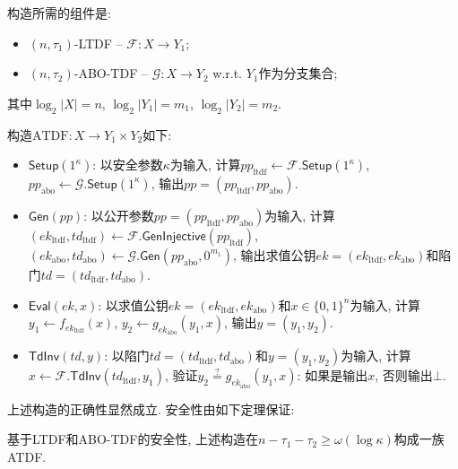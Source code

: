 \begin{construction}
\begin{trivlist}
\item 构造所需的组件是:
\begin{itemize}
    \item $(n, \tau_1)$-LTDF -- $\mathcal{F}: X \rightarrow Y_1$; 
    \item $(n, \tau_2)$-ABO-TDF -- $\mathcal{G}: X \rightarrow Y_2$ w.r.t. $Y_1$作为分支集合; 
\end{itemize}
其中$\log_2 |X| = n$, $\log_2 |Y_1| = m_1$, $\log_2 |Y_2| = m_2$. 

\item 构造$\text{ATDF}: X \rightarrow Y_1 \times Y_2$如下: 
\begin{itemize}
\item $\mathsf{Setup}(1^\kappa)$: 以安全参数$\kappa$为输入, 
	计算$pp_\text{ltdf} \leftarrow \mathcal{F}.\mathsf{Setup}(1^\kappa)$, 
	$pp_\text{abo} \leftarrow \mathcal{G}.\mathsf{Setup}(1^\kappa)$, 
	输出$pp = (pp_\text{ltdf}, pp_\text{abo})$.  

\item $\mathsf{Gen}(pp)$: 以公开参数$pp = (pp_\text{ltdf}, pp_\text{abo})$为输入, 
	计算$(ek_\text{ltdf}, td_\text{ltdf}) \leftarrow \mathcal{F}.\mathsf{GenInjective}(pp_\text{ltdf})$, 
	$(ek_\text{abo}, td_\text{abo}) \leftarrow \mathcal{G}.\mathsf{Gen}(pp_\text{abo}, 0^{m_1})$, 
	输出求值公钥$ek = (ek_\text{ltdf}, ek_\text{abo})$和陷门$td = (td_\text{ltdf}, td_\text{abo})$.  

\item $\mathsf{Eval}(ek, x)$: 以求值公钥$ek = (ek_\text{ltdf}, ek_\text{abo})$和$x \in \{0,1\}^n$为输入, 
	计算$y_1 \leftarrow f_{ek_\text{ltdf}}(x)$, $y_2 \leftarrow g_{ek_\text{abo}}(y_1, x)$, 输出$y = (y_1, y_2)$. 

\item $\mathsf{TdInv}(td, y)$: 以陷门$td = (td_\text{ltdf}, td_\text{abo})$和$y = (y_1, y_2)$为输入, 
	计算$x \leftarrow \mathcal{F}.\mathsf{TdInv}(td_\text{ltdf}, y_1)$, 
	验证$y_2 \stackrel{?}{=} g_{ek_\text{abo}}(y_1, x)$: 如果是输出$x$, 否则输出$\bot$. 
\end{itemize}
\end{trivlist}
\end{construction}

上述构造的正确性显然成立. 安全性由如下定理保证: 
\begin{theorem}
基于LTDF和ABO-TDF的安全性, 上述构造在$n - \tau_1 - \tau_2 \geq \omega(\log \kappa)$构成一族ATDF.
\end{theorem}

